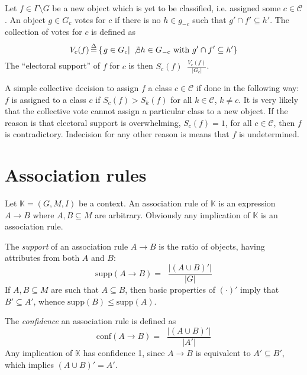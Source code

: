 \documentclass[a4paper]{article}
\newcommand{\obj}[1]{{\left\{ #1 \right \}}}
\newcommand{\brac}[1]{{\left ( #1 \right )}}
\newcommand{\induc}[1]{{\left . #1 \right \vert}}
\newcommand{\abs}[1]{{\left | #1 \right |}}
\newcommand{\Ctx}{\mathbb{K}}
\newcommand{\supp}{\text{supp}}
\newcommand{\conf}{\text{conf}}
\newcommand{\defn}{\mathop{\overset{\Delta}{=}}\nolimits}
\begin{document}
Let $f\in \Gamma\setminus G$ be a new object which is yet to be classified, i.e. assigned some $c\in \mathcal{C}$. An object $g\in G_c$ votes for $c$ if there is no $h\in g_{-c}$ such that $g' \cap f'\subseteq h'$. The collection of votes for $c$ is defined as \[V_c(f) \defn\obj{ \induc{ g\in G_c }\, \not\exists h\in G_{-c}\text{ with } g' \cap f'\subseteq h' }\] The ``electoral support'' of $f$ for $c$ is then $S_c(f)\defn \frac{V_c(f)}{\abs{G_c}}$.

A simple collective decision to assign $f$ a class $c\in \mathcal{C}$ if done in the following way: $f$ is assigned to a class $c$ if $S_c(f) > S_k(f)$ for all $k\in \mathcal{C}$, $k\neq c$. It is very likely that the collective vote cannot assign a particular class to a new object. If the reason is that electoral support is overwhelming, $S_c(f)=1$, for all $c\in \mathcal{C}$, then $f$ is contradictory. Indecision for any other reason is means that $f$ is undetermined.





\section{Association rules} %
\label{sec:association_rules}

Let $\Ctx=\brac{G,M,I}$ be a context. An association rule of $\Ctx$ is an expression $A\to B$ where $A,B\subseteq M$ are arbitrary. Obviously any implication of $\Ctx$ is an association rule.

The \emph{support} of an association rule $A\to B$ is the ratio of objects, having attributes from both $A$ and $B$:\[\supp\brac{A\to B} = \defn \frac{\abs{\brac{A\cup B}'}}{\abs{G}}\] If $A,B\subseteq M$ are such that $A\subseteq B$, then basic properties of ${(\cdot)}'$ imply that $B'\subseteq A'$, whence $\supp(B)\leq \supp(A)$.

The \emph{confidence} an association rule is defined as \[\conf\brac{A\to B} = \defn \frac{\abs{\brac{A\cup B}'}}{\abs{A'}}\] Any implication of $\Ctx$ has confidence 1, since $A\to B$ is equivalent to $A'\subseteq B'$, which implies $\brac{A\cup B}' = A'$.
\end{document}
